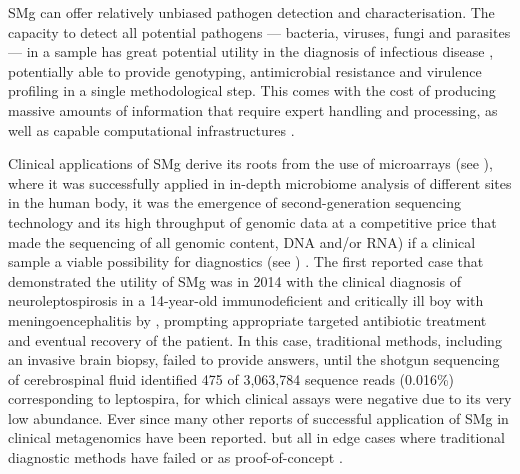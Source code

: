 \ac{SMg} can offer relatively unbiased pathogen detection and characterisation. The capacity to detect all potential pathogens — bacteria, viruses, fungi and parasites — in a sample has great potential utility in the diagnosis of infectious disease \citep{chiu_clinical_2019}, potentially able to provide genotyping, antimicrobial resistance and virulence profiling in a single methodological step. This comes with the cost of producing massive amounts of information that require expert handling and processing, as well as capable computational infrastructures \citep{couto_critical_2018, rossen_practical_2018}.

Clinical applications of \ac{SMg} derive its roots from the use of microarrays (see ), where it was successfully applied in in-depth microbiome analysis of different sites in the human body, it was the emergence of second-generation sequencing technology and its high throughput of genomic data at a competitive price that made the sequencing of all genomic content, DNA and/or RNA) if a clinical sample a viable possibility for diagnostics (see ) \citep{miller_basic_2009, palmer_rapid_2006, chiu_clinical_2019}. The first reported case that demonstrated the utility of \ac{SMg} was in 2014 with the clinical diagnosis of neuroleptospirosis in a 14-year-old immunodeficient and critically ill boy with meningoencephalitis by \cite{wilson_actionable_2014}, prompting appropriate targeted antibiotic treatment and eventual recovery of the patient. In this case, traditional methods, including an invasive brain biopsy, failed to provide answers, until the shotgun sequencing of cerebrospinal fluid identified 475 of 3,063,784 sequence reads (0.016\%) corresponding to leptospira, for which clinical assays were negative due to its very low abundance. Ever since many other reports of successful application of \ac{SMg} in clinical metagenomics have been reported. but all in edge cases where traditional diagnostic methods have failed or as proof-of-concept \citep{couto_critical_2018, vijayvargiya_application_2019, sanabria_shotgun-metagenomics_2020, hirakata_application_2021}. 

